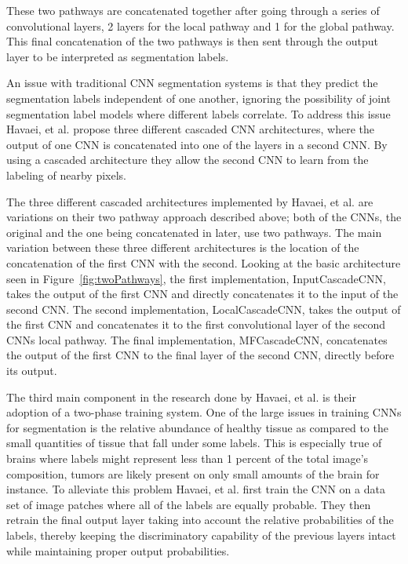 \documentclass{sig-alternate}
\begin{document}
These two pathways are concatenated together after going through a series of convolutional layers, 2 layers for the local pathway and 1 for the global pathway. This final concatenation of the two pathways is then sent through the output layer to be interpreted as segmentation labels.

An issue with traditional CNN segmentation systems is that they predict the segmentation labels independent of one another, ignoring the possibility of joint segmentation label models where different labels correlate. To address this issue Havaei, et al. propose three different cascaded CNN architectures, where the output of one CNN is concatenated into one of the layers in a second CNN. By using a cascaded architecture they allow the second CNN to learn from the labeling of nearby pixels.

\begin{figure*}
\centering
{}
\caption{The base two-pathway architecture used by Havaei, et al. ~\cite{Havaei:2017}}
\label{fig:twoPathways}
\end{figure*}

The three different cascaded architectures implemented by Havaei, et al. are variations on their two pathway approach described above; both of the CNNs, the original and the one being concatenated in later, use two pathways. The main variation between these three different architectures is the location of the concatenation of the first CNN with the second. Looking at the basic architecture seen in Figure~\ref{fig:twoPathways}, the first implementation, InputCascadeCNN, takes the output of the first CNN and directly concatenates it to the input of the second CNN. The second implementation, LocalCascadeCNN, takes the output of the first CNN and concatenates it to the first convolutional layer of the second CNNs local pathway. The final implementation, MFCascadeCNN, concatenates the output of the first CNN to the final layer of the second CNN, directly before its output.

The third main component in the research done by Havaei, et al. is their adoption of a two-phase training system. One of the large issues in training CNNs for segmentation is the relative abundance of healthy tissue as compared to the small quantities of tissue that fall under some labels. This is especially true of brains where labels might represent less than 1 percent of the total image's composition, tumors are likely present on only small amounts of the brain for instance. To alleviate this problem Havaei, et al. first train the CNN on a data set of image patches where all of the labels are equally probable. They then retrain the final output layer taking into account the relative probabilities of the labels, thereby keeping the discriminatory capability of the previous layers intact while maintaining proper output probabilities.
\end{document}
